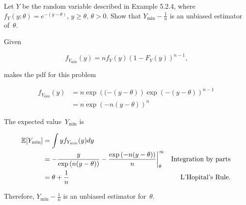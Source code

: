 \begin{problem}
   Let $Y$ be the random variable described in Example 5.2.4, where ${f_{Y} (y; \theta) = e^{-(y-\theta)}\text{, }y \geq \theta\text{, }\theta > 0}$. Show that ${Y_{\min} - \frac{1}{n}}$ is an unbiased estimator of~$\theta$.
\end{problem}

Given

\begin{equation}
  f_{Y_{\min}}(y) = n f_Y(y) (1 - F_Y(y))^{n-1}\text{,}
\end{equation}

\noindent
makes the pdf for this problem

\begin{align*}
  f_{Y_{\min}}(y) &= n\exp\left((-(y-\theta)\right) \exp\left(-(y-\theta)\right)^{n-1} \\
                  &= n \exp\left(-n(y-\theta)\right)^{n}
\end{align*}

The expected value~$Y_{\min}$ is

\begin{align*}
  \mathbb{E}\lbrack Y_{\min}\rbrack &= \int y f_{Y_{\min}}(y) dy \\
                    &= -\frac{y}{\exp\left(n(y-\theta)\right)} - \frac{\exp\left(-n(y-\theta)\right)}{n} \bigg\vert_{\theta}^{\infty} & \text{Integration by parts} \\
                    &= \theta + \frac{1}{n} & \text{L'Hopital's Rule} \text{.}
\end{align*}

\noindent
Therefore, $\boxed{Y_{\min} - \frac{1}{n}}$ is an unbiased estimator for~$\theta$.
